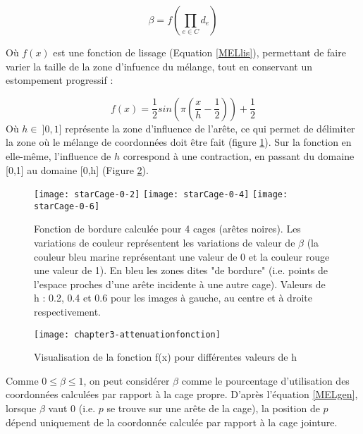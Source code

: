 \begin{equation}
  \beta = f(\prod_{e \in C} d_e)
\end{equation}

Où $f(x)$ est une fonction de lissage (Equation \ref{MELlis}),
permettant de faire varier la taille de la zone d'infuence du mélange,
tout en conservant un estompement progressif :

\begin{equation}
  f(x) = \frac{1}{2} sin(\pi(\frac{x}{h}-\frac{1}{2})) + \frac{1}{2}
  \label{MELlis}
\end{equation}
Où $h \in~ ]0,1]$ représente la zone d'influence de l'arête, ce qui
permet de délimiter la zone où le mélange de coordonnées doit être
fait (figure \ref{MELpar}). Sur la fonction en elle-même, l'influence
de $h$ correspond à une contraction, en passant du domaine [0,1] au
domaine [0,h] (Figure \ref{MELfon}).

\begin{figure}[ht]
  \begin{center}
    \texttt{[image: starCage-0-2]}
    \texttt{[image: starCage-0-4]}
    \texttt{[image: starCage-0-6]}
    \caption{Fonction de bordure calculée pour 4 cages (arêtes
      noires). Les variations de couleur représentent les variations
      de valeur de $\beta$ (la couleur bleu marine représentant une
      valeur de 0 et la couleur rouge une valeur de 1). En bleu les
      zones dites "de bordure" (i.e. points de l'espace proches d'une
      arête incidente à une autre cage). Valeurs de h : 0.2, 0.4 et
      0.6 pour les images à gauche, au centre et à droite
      respectivement.}
    \label{MELpar}
  \end{center}
\end{figure}

\begin{figure}[ht]
  \begin{center}
    \texttt{[image: chapter3-attenuationfonction]}
    \caption{Visualisation de la fonction f(x) pour différentes
      valeurs de h}
    \label{MELfon}
  \end{center}
\end{figure}

Comme $0 \leq \beta \leq 1$, on peut considérer $\beta$ comme le
pourcentage d'utilisation des coordonnées calculées par rapport à la
cage propre. D'après l'équation \ref{MELgen}, lorsque $\beta$ vaut 0
(i.e. $p$ se trouve sur une arête de la cage), la position de $p$
dépend uniquement de la coordonnée calculée par rapport à la cage
jointure.

